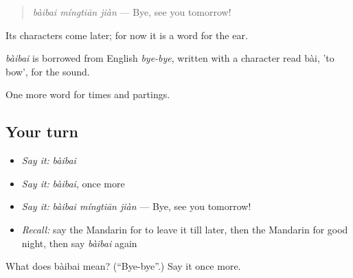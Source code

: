 \begin{quote}
\emph{bàibai míngtiān jiàn} — Bye, see you tomorrow!
\end{quote}

Its characters come later; for now it is a word for the ear.

\begin{cousinweb}
\emph{bàibai} is borrowed from English \emph{bye-bye}, written with a character read bài, 'to bow', for the sound.
\end{cousinweb}

\begin{grammarlens}[title={What you've built}]
One more word for times and partings.
\end{grammarlens}

\subsection*{Your turn}
\begin{itemize}
\raggedright
  \item \emph{Say it:} \emph{bàibai}
  \item \emph{Say it:} \emph{bàibai}, once more
  \item \emph{Say it:} \emph{bàibai míngtiān jiàn} — Bye, see you tomorrow!
  \item \emph{Recall:} say the Mandarin for to leave it till later, then the Mandarin for good night, then say \emph{bàibai} again
\end{itemize}

\begin{tcolorbox}[breakable,colback=teal!4,colframe=teal!35!black,title={Before you move on}]
What does bàibai mean? (\textquotedblleft{}Bye-bye\textquotedblright{}.) Say it once more.
\end{tcolorbox}
